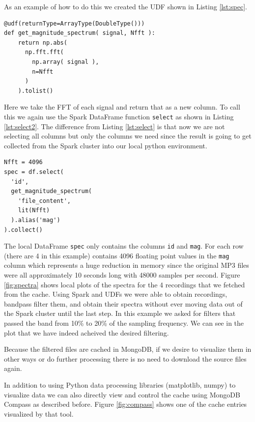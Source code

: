 \documentclass[conference,twoside]{IEEEtran}
\newcommand{\code}[1]{\texttt{#1}}
\begin{document}
As an example of how to do this we created the UDF shown in Listing \ref{lst:spec}.
\begin{lstlisting}[language=Txt, caption={Taking FFTs with Spark}, label={lst:spec}]
@udf(returnType=ArrayType(DoubleType()))
def get_magnitude_spectrum( signal, Nfft ):
    return np.abs(
      np.fft.fft(
        np.array( signal ),
        n=Nfft
      )
    ).tolist()
\end{lstlisting}
Here we take the FFT of each signal and return that as a new column. To call this we again use the Spark DataFrame function \code{select} as shown in Listing \ref{lst:select2}. The difference from Listing \ref{lst:select} is that now we are not selecting all columns but only the columns we need since the result is going to get collected from the Spark cluster into our local python environment.
\begin{lstlisting}[language=Txt, caption={Collecting UDF Results for Local Processing}, label={lst:select2}]
Nfft = 4096
spec = df.select(
  'id',
  get_magnitude_spectrum(
    'file_content',
    lit(Nfft)
  ).alias('mag')
).collect()
\end{lstlisting}
The local DataFrame \code{spec} only contains the columns \code{id} and \code{mag}. For each row (there are 4 in this example) contains 4096 floating point values in the \code{mag} column which represents a huge reduction in memory since the original MP3 files were all approximately 10 seconds long with 48000 samples per second. Figure \ref{fig:spectra} shows local plots of the spectra for the 4 recordings that we fetched from the cache. Using Spark and UDFs we were able to obtain recordings, bandpass filter them, and obtain their spectra without ever moving data out of the Spark cluster until the last step. In this example we asked for filters that passed the band from 10\% to 20\% of the sampling frequency. We can see in the plot that we have indeed acheived the desired filtering.

Because the filtered files are cached in MongoDB, if we desire to visualize them in other ways or do further processing there is no need to download the source files again.

In addition to using Python data processing libraries (matplotlib, numpy) to visualize data we can also directly view and control the cache using MongoDB Compass\cite{mongodbcompass} as described before. Figure \ref{fig:compass} shows one of the cache entries visualized by that tool.

\end{document}
